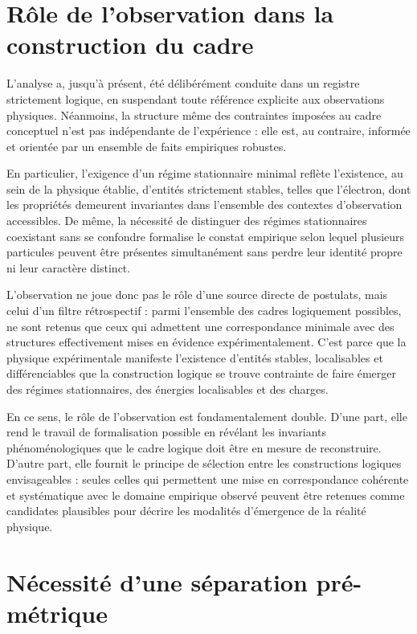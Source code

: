 \documentclass[11pt,a4paper]{article}
\begin{document}
\section{Rôle de l’observation dans la construction du cadre}

L’analyse a, jusqu’à présent, été délibérément conduite dans un registre strictement logique, en suspendant toute référence explicite aux observations physiques. Néanmoins, la structure même des contraintes imposées au cadre conceptuel n’est pas indépendante de l’expérience : elle est, au contraire, informée et orientée par un ensemble de faits empiriques robustes.

En particulier, l’exigence d’un régime stationnaire minimal reflète l’existence, au sein de la physique établie, d’entités strictement stables, telles que l’électron, dont les propriétés demeurent invariantes dans l’ensemble des contextes d’observation accessibles. De même, la nécessité de distinguer des régimes stationnaires coexistant sans se confondre formalise le constat empirique selon lequel plusieurs particules peuvent être présentes simultanément sans perdre leur identité propre ni leur caractère distinct.

L’observation ne joue donc pas le rôle d’une source directe de postulats, mais celui d’un filtre rétrospectif : parmi l’ensemble des cadres logiquement possibles, ne sont retenus que ceux qui admettent une correspondance minimale avec des structures effectivement mises en évidence expérimentalement. C’est parce que la physique expérimentale manifeste l’existence d’entités stables, localisables et différenciables que la construction logique se trouve contrainte de faire émerger des régimes stationnaires, des énergies localisables et des charges.

En ce sens, le rôle de l’observation est fondamentalement double. D’une part, elle rend le travail de formalisation possible en révélant les invariants phénoménologiques que le cadre logique doit être en mesure de reconstruire. D’autre part, elle fournit le principe de sélection entre les constructions logiques envisageables : seules celles qui permettent une mise en correspondance cohérente et systématique avec le domaine empirique observé peuvent être retenues comme candidates plausibles pour décrire les modalités d’émergence de la réalité physique.

\section{Nécessité d’une séparation pré-métrique}
\end{document}
